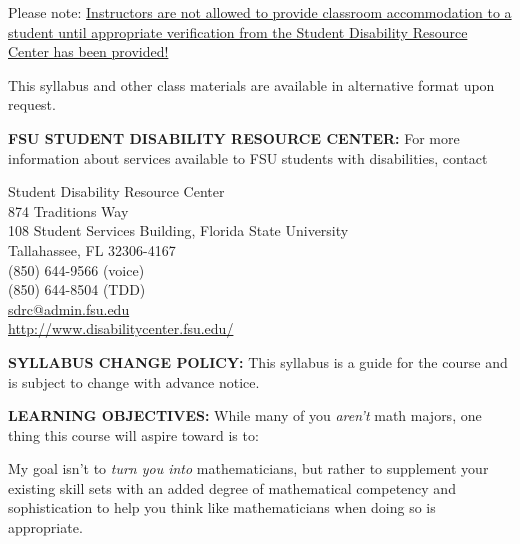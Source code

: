 \documentclass[12pt,oneside]{amsart}
\begin{document}
Please note: \ul{Instructors are not allowed to provide classroom accommodation to a student until appropriate verification from the Student Disability Resource Center has been provided!}

\noindent This syllabus and other class materials are available in alternative format upon request.

\noindent \textbf{FSU STUDENT DISABILITY RESOURCE CENTER:} For more information about services available to FSU students with disabilities, contact

{\centering
 Student Disability Resource Center
\\
874 Traditions Way
\\
108 Student Services Building, 
Florida State University
\\
Tallahassee, FL 32306-4167
\\
(850) 644-9566 (voice)
\\
(850) 644-8504 (TDD)
\\
\url{sdrc@admin.fsu.edu}
\\
\url{http://www.disabilitycenter.fsu.edu/}
\\
}

\vspace{12pt}

\noindent \textbf{SYLLABUS CHANGE POLICY:} This syllabus is a guide for the course and is subject to change with advance notice.

\newpage

\noindent \textbf{LEARNING OBJECTIVES:} While many of you \textit{aren't} math majors, one thing this course will aspire toward is to: \vspace{-3mm}\begin{center}\end{center}\vspace{-1.5mm}

\noindent My goal isn't to \textit{turn you into} mathematicians, but rather to supplement your existing skill sets with an added degree of mathematical competency and sophistication to help you think like mathematicians when doing so is appropriate. 
\end{document}
